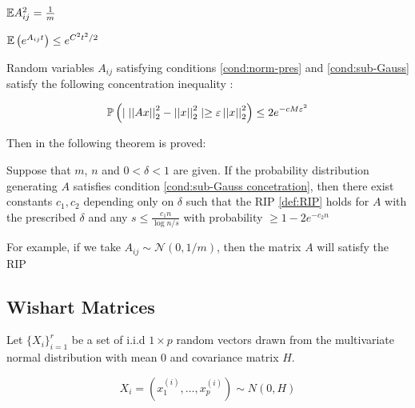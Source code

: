 \begin{condition}
\({\mathbb{E}} A_{ij}^2 = \frac{1}{m}\)
\label{cond:norm-pres}
\end{condition}

\begin{condition}
\({\mathbb{E}}\left( e^{A_{ij}t} \right) \leq e^{C^2 t^2 /2}\)
\label{cond:sub-Gauss}
\end{condition}

Random variables \(A_{ij}\) satisfying conditions \eqref{cond:norm-pres} and \eqref{cond:sub-Gauss} satisfy the following concentration inequality \cite{baraniuk2008simple}:

\begin{lemma}
\begin{equation}
{\mathbb{P}}\left( \mid \left|\left|Ax\right|\right|_2^2 - \left|\left|x\right|\right|_2^2 \mid \geq \varepsilon  \left|\left|x\right|\right|_2^2 \right) \leq 2e^{-cM\varepsilon^2}
\label{cond:sub-Gauss concetration}
\end{equation} 
\end{lemma}

Then in \cite{baraniuk2008simple} the following theorem is proved:

\begin{theorem}
Suppose that \(m\), \(n\) and \(0 < \delta < 1\) are given. If the probability distribution generating \(A\) satisfies condition \eqref{cond:sub-Gauss concetration}, then there exist constants \(c_1, c_2\) depending only on \(\delta\) such that the RIP \eqref{def:RIP} holds for \(A\) with the prescribed \(\delta\) and any  \(s \leq \frac{c_1 n}{\log{n/s}}\) with probability \(\geq 1-2e^{-c_2n}\) 
\end{theorem}

For example, if we take \(A_{ij} \sim \mathcal{N}\left(0, 1/m\right)\), then the matrix \(A\) will satisfy the RIP 

\subsection{Wishart Matrices}

Let \(\{X_i\}_{i=1}^r\) be a set of i.i.d \(1 \times p\) random vectors drawn from the multivariate normal distribution with mean 0 and covariance matrix \(H\).

\begin{equation}
X_i = \left(x_1^{(i)}, \ldots , x_p^{(i)}\right) \sim N\left(0, H\right)
\end{equation}


